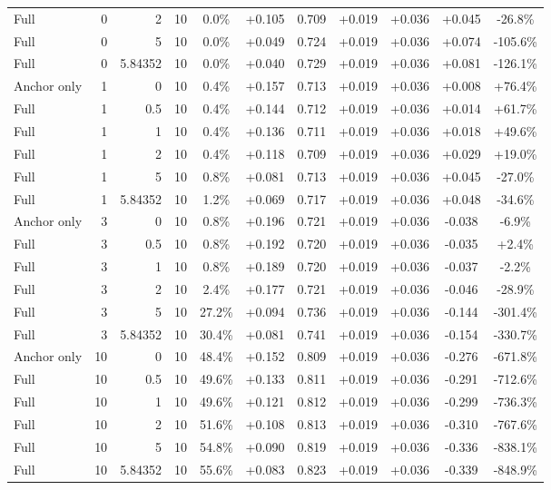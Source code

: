 \begin{table}[htbp]
\begin{tabular}{lrrrccccccc}
Full & 0 & 2 & 10 & 0.0\% & +0.105 & 0.709 & +0.019 & +0.036 & +0.045 & -26.8\% \\
Full & 0 & 5 & 10 & 0.0\% & +0.049 & 0.724 & +0.019 & +0.036 & +0.074 & -105.6\% \\
Full & 0 & 5.84352 & 10 & 0.0\% & +0.040 & 0.729 & +0.019 & +0.036 & +0.081 & -126.1\% \\
Anchor only & 1 & 0 & 10 & 0.4\% & +0.157 & 0.713 & +0.019 & +0.036 & +0.008 & +76.4\% \\
Full & 1 & 0.5 & 10 & 0.4\% & +0.144 & 0.712 & +0.019 & +0.036 & +0.014 & +61.7\% \\
Full & 1 & 1 & 10 & 0.4\% & +0.136 & 0.711 & +0.019 & +0.036 & +0.018 & +49.6\% \\
Full & 1 & 2 & 10 & 0.4\% & +0.118 & 0.709 & +0.019 & +0.036 & +0.029 & +19.0\% \\
Full & 1 & 5 & 10 & 0.8\% & +0.081 & 0.713 & +0.019 & +0.036 & +0.045 & -27.0\% \\
Full & 1 & 5.84352 & 10 & 1.2\% & +0.069 & 0.717 & +0.019 & +0.036 & +0.048 & -34.6\% \\
Anchor only & 3 & 0 & 10 & 0.8\% & +0.196 & 0.721 & +0.019 & +0.036 & -0.038 & -6.9\% \\
Full & 3 & 0.5 & 10 & 0.8\% & +0.192 & 0.720 & +0.019 & +0.036 & -0.035 & +2.4\% \\
Full & 3 & 1 & 10 & 0.8\% & +0.189 & 0.720 & +0.019 & +0.036 & -0.037 & -2.2\% \\
Full & 3 & 2 & 10 & 2.4\% & +0.177 & 0.721 & +0.019 & +0.036 & -0.046 & -28.9\% \\
Full & 3 & 5 & 10 & 27.2\% & +0.094 & 0.736 & +0.019 & +0.036 & -0.144 & -301.4\% \\
Full & 3 & 5.84352 & 10 & 30.4\% & +0.081 & 0.741 & +0.019 & +0.036 & -0.154 & -330.7\% \\
Anchor only & 10 & 0 & 10 & 48.4\% & +0.152 & 0.809 & +0.019 & +0.036 & -0.276 & -671.8\% \\
Full & 10 & 0.5 & 10 & 49.6\% & +0.133 & 0.811 & +0.019 & +0.036 & -0.291 & -712.6\% \\
Full & 10 & 1 & 10 & 49.6\% & +0.121 & 0.812 & +0.019 & +0.036 & -0.299 & -736.3\% \\
Full & 10 & 2 & 10 & 51.6\% & +0.108 & 0.813 & +0.019 & +0.036 & -0.310 & -767.6\% \\
Full & 10 & 5 & 10 & 54.8\% & +0.090 & 0.819 & +0.019 & +0.036 & -0.336 & -838.1\% \\
Full & 10 & 5.84352 & 10 & 55.6\% & +0.083 & 0.823 & +0.019 & +0.036 & -0.339 & -848.9\% \\

\end{tabular}
\end{table}
